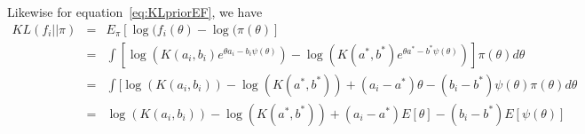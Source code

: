 \documentclass[a4paper, notitlepage, 10pt]{article}
\begin{document}
Likewise for equation~\ref{eq:KLpriorEF}, we have 
\begin{eqnarray*} 
KL(f_i || \pi) & = & E_\pi[\log(f_i(\theta)-\log(\pi(\theta)] \\
              & = & \int [\log( K(a_i,b_i) e^{\theta a_i - b_i \psi(\theta)}) - \log(K(a^*,b^*) e^{\theta a^* - b^* \psi(\theta)}) ] \pi(\theta) d\theta \\
              & = & \int [\log( K(a_i,b_i)) - \log(K(a^*,b^*)) + (a_i - a^*) \theta  - (b_i - b^*) \psi(\theta) \pi(\theta) d\theta \\
              & = & \log( K(a_i,b_i)) - \log(K(a^*,b^*)) + (a_i - a^*) E[\theta] - (b_i - b^*) E[\psi(\theta)] 
\end{eqnarray*}
\end{document}
